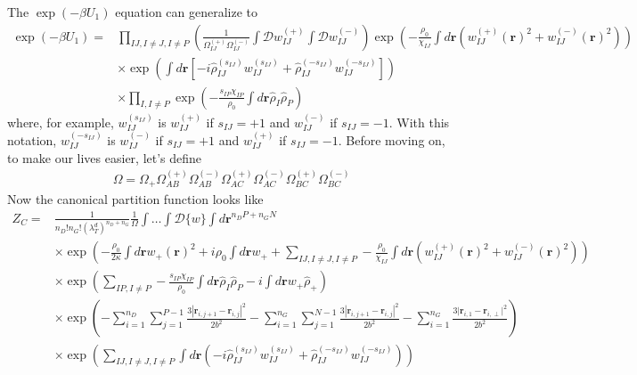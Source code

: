 \documentclass{article}
\begin{document}
  The $\exp (-\beta U_1)$ equation can generalize to
  \begin{align*}
    \exp (-\beta U_1) =&
      \prod_{IJ, I \ne J, I \ne P} \left(
        \frac{1}{\Omega_{IJ}^{(+)}\Omega_{IJ}^{(-)}}
        \int \mathcal{D} w_{IJ}^{(+)} \int \mathcal{D} w_{IJ}^{(-)}
      \right)
      \exp \left(
        -\frac{\rho_0}{\chi_{IJ}}
        \int d \mathbf{r} \left( 
          w_{IJ}^{(+)}(\mathbf{r})^2 + w_{IJ}^{(-)}(\mathbf{r})^2
        \right)
      \right) \\
      &\times
      \exp \left(
        \int d \mathbf{r} \left[ 
          - i \hat{\rho}_{IJ}^{(s_{IJ})} w_{IJ}^{(s_{IJ})}
          + \hat{\rho}_{IJ}^{(-s_{IJ})} w_{IJ}^{(-s_{IJ})}
        \right]
      \right) \\
      &\times
      \prod_{I, I \ne P} \exp \left(
        - \frac{s_{IP}\chi_{IP}}{\rho_0}
        \int d \mathbf{r} \hat{\rho}_I \hat{\rho}_P
      \right)
  \end{align*}
  where, for example, $w_{IJ}^{(s_{IJ})}$ is $w_{IJ}^{(+)}$ if $s_{IJ} = +1$ and
    $w_{IJ}^{(-)}$ if $s_{IJ} = -1$.
  With this notation, $w_{IJ}^{(-s_{IJ})}$ is $w_{IJ}^{(-)}$ if $s_{IJ} = +1$ and
    $w_{IJ}^{(+)}$ if $s_{IJ} = -1$.
  Before moving on, to make our lives easier, let's define
  \begin{align*}
    \Omega =
      \Omega_+
      \Omega_{AB}^{(+)} \Omega_{AB}^{(-)}
      \Omega_{AC}^{(+)} \Omega_{AC}^{(-)}
      \Omega_{BC}^{(+)} \Omega_{BC}^{(-)}
  \end{align*}
  Now the canonical partition function looks like
  \begin{align*}
    Z_C =& \frac{1}{n_D!n_G! \left( \lambda_T^d \right)^{n_D+n_G}}
      \frac{1}{\Omega}
      \int \hdots \int \mathcal{D} \{w\}
      \int d \mathbf{r}^{n_D P + n_G N} \\
      &\times
      \exp \left(
        - \frac{\rho_0}{2\kappa} \int d \mathbf{r} w_+(\mathbf{r})^2
        + i \rho_0 \int d\mathbf{r} w_+
        + \sum_{IJ,I \ne J, I \ne P}
        - \frac{\rho_0}{\chi_{IJ}}
        \int d \mathbf{r}
        \left(
          w_{IJ}^{(+)} (\mathbf{r})^2 + w_{IJ}^{(-)} (\mathbf{r})^2
        \right)
      \right) \\
      &\times
      \exp \left(
        \sum_{IP,I \ne P}
        - \frac{s_{IP}\chi_{IP}}{\rho_0}
        \int d \mathbf{r} \hat{\rho}_I \hat{\rho}_P
        - i\int d \mathbf{r} w_+ \hat{\rho}_+
      \right) \\
      &\times
      \exp \left(
        - \sum_{i=1}^{n_D} \sum_{j=1}^{P-1}
        \frac{3 \left| \mathbf{r}_{i,j+1} - \mathbf{r}_{i,j} \right| ^ 2 }
             { 2 b^2 }
        - \sum_{i=1}^{n_G} \sum_{j=1}^{N-1}
        \frac{3 \left| \mathbf{r}_{i,j+1} - \mathbf{r}_{i,j} \right| ^ 2 }
             { 2 b^2 } 
        -
        \sum_{i=1}^{n_G}  \frac{3\vert \mathbf{r}_{i,1} - \mathbf{r}_{i,\perp} \vert^2} %
        {2b^2}  %
      \right) \\
      &\times
      \exp \left(
        \sum_{IJ, I \ne J, I \ne P}
        \int d \mathbf{r} \left(
          -i \hat{\rho}_{IJ}^{(s_{IJ})} w_{IJ}^{(s_{IJ})}
          + \hat{\rho}_{IJ}^{(-s_{IJ})} w_{IJ}^{(-s_{IJ})}
        \right)
      \right)
  \end{align*}
\end{document}
